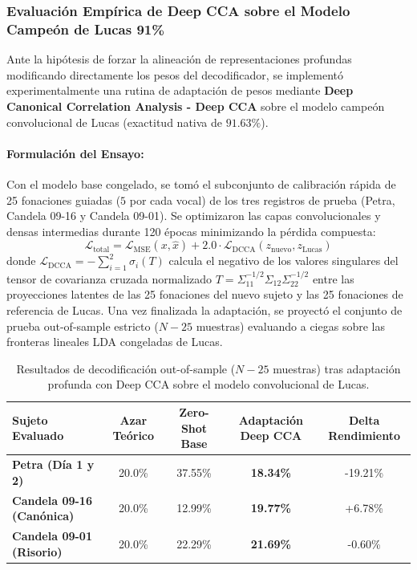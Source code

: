 \documentclass[11pt,a4paper]{article}
\begin{document}
\subsubsection{Evaluación Empírica de Deep CCA sobre el Modelo Campeón de Lucas 91\%}
\label{subsubsec:evaluacion_deep_cca_campeon}

Ante la hipótesis de forzar la alineación de representaciones profundas modificando directamente los pesos del decodificador, se implementó experimentalmente una rutina de adaptación de pesos mediante \textbf{Deep Canonical Correlation Analysis - Deep CCA} sobre el modelo campeón convolucional de Lucas (exactitud nativa de $91.63\%$).

\paragraph{Formulación del Ensayo:}
Con el modelo base congelado, se tomó el subconjunto de calibración rápida de 25 fonaciones guiadas ($5$ por cada vocal) de los tres registros de prueba (Petra, Candela 09-16 y Candela 09-01). Se optimizaron las capas convolucionales y densas intermedias durante 120 épocas minimizando la pérdida compuesta:
\begin{equation}
    \mathcal{L}_{\text{total}} = \mathcal{L}_{\text{MSE}}(x, \hat{x}) + 2.0 \cdot \mathcal{L}_{\text{DCCA}}(z_{\text{nuevo}}, z_{\text{Lucas}})
\end{equation}
donde $\mathcal{L}_{\text{DCCA}} = -\sum_{i=1}^2 \sigma_i(T)$ calcula el negativo de los valores singulares del tensor de covarianza cruzada normalizado $T = \Sigma_{11}^{-1/2} \Sigma_{12} \Sigma_{22}^{-1/2}$ entre las proyecciones latentes de las 25 fonaciones del nuevo sujeto y las 25 fonaciones de referencia de Lucas. Una vez finalizada la adaptación, se proyectó el conjunto de prueba out-of-sample estricto ($N - 25$ muestras) evaluando a ciegas sobre las fronteras lineales LDA congeladas de Lucas.

\begin{table}[H]
\centering
\small
\begin{tabular}{lcccc}
\toprule
\textbf{Sujeto Evaluado} & \textbf{Azar Teórico} & \textbf{Zero-Shot Base} & \textbf{Adaptación Deep CCA} & \textbf{Delta Rendimiento} \\
\midrule
\textbf{Petra (Día 1 y 2)} & 20.0\% & 37.55\% & \textbf{18.34\%} & -19.21\% \\
\textbf{Candela 09-16 (Canónica)} & 20.0\% & 12.99\% & \textbf{19.77\%} & +6.78\% \\
\textbf{Candela 09-01 (Risorio)} & 20.0\% & 22.29\% & \textbf{21.69\%} & -0.60\% \\
\bottomrule
\end{tabular}
\caption{Resultados de decodificación out-of-sample ($N-25$ muestras) tras adaptación profunda con Deep CCA sobre el modelo convolucional de Lucas.}
\label{tab:resultados_deep_cca_calibracion}
\end{table}
\end{document}
